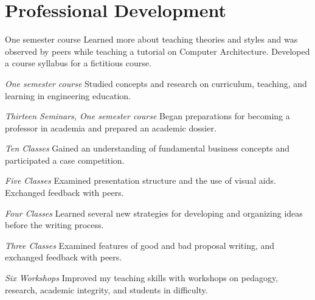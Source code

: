 \pagebreak
\section{\sc Professional Development}

{One semester course}{ }
{
  Learned more about teaching theories and styles and was observed by peers while teaching a tutorial on Computer Architecture.
  Developed a course syllabus for a fictitious course.
}

{\em One semester course}{ }
{
  Studied concepts and research on curriculum, teaching, and learning in engineering education.
}

{\em Thirteen Seminars, One semester course}{ }
{
  Began preparations for becoming a professor in academia and prepared an academic dossier.
}

{\em Ten Classes}{ }
{
  Gained an understanding of fundamental business concepts and participated a case competition.
}

{\em Five Classes}{ }
{
  Examined presentation structure and the use of visual aids.
  Exchanged feedback with peers.
}

{\em Four Classes}{ }
{
  Learned several new strategies for developing and organizing ideas before the writing process.
}

{\em Three Classes}{ }
{
  Examined features of good and bad proposal writing, and exchanged feedback with peers.
}

{\em Six Workshops}{ }
{
  Improved my teaching skills with workshops on pedagogy, research, academic integrity, and students in difficulty.
}
